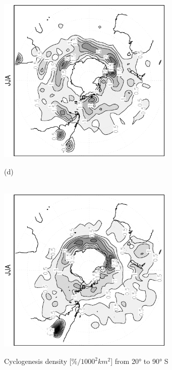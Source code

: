 \documentclass[12pt,a4paper,twoside,openright,headinclude,liststotoc,bibtotoc]{scrreprt}
\begin{document}
\begin{appendix}
\begin{figure}[b]
{\includegraphics[height=8.0cm,angle=-90]
{eps/cyclgen_PLASIM_T21_45JJA_SH.eps}
}
\parbox{8.5cm}{\hspace{0.95cm}\begin{scriptsize}(d)\end{scriptsize} \vspace{-0.5cm} \\
\includegraphics[height=8.0cm,angle=-90]
{eps/cyclgen_ERA40_T21_45JJA_SH.eps}
}
\caption[Cyclogenesis density Southern Hemisphere]{Cyclogenesis density [$\%/1000^2 km^2$] from 20° to 90° S}
\label{img:SHcyclgen}
\end{figure}



\end{appendix}
\end{document}

